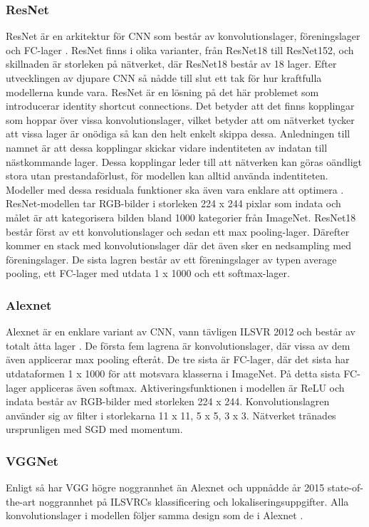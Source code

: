 \documentclass[]{kththesis}
\begin{document}
\subsubsection{ResNet}
ResNet är en arkitektur för CNN som består av konvolutionslager, föreningslager och FC-lager \parencite{he2016deep}. ResNet finns i olika varianter, från ResNet18 till ResNet152, och skillnaden är storleken på nätverket, där ResNet18 består av 18 lager. Efter utvecklingen av djupare CNN så nådde till slut ett tak för hur kraftfulla modellerna kunde vara. ResNet är en lösning på det här problemet som introducerar identity shortcut connections. Det betyder att det finns kopplingar som hoppar över vissa konvolutionslager, vilket betyder att om nätverket tycker att vissa lager är onödiga så kan den helt enkelt skippa dessa. Anledningen till namnet är att dessa kopplingar skickar vidare indentiteten av indatan till nästkommande lager. Dessa kopplingar leder till att nätverken kan göras oändligt stora utan prestandaförlust, för modellen kan alltid använda indentiteten. Modeller med dessa residuala funktioner ska även vara enklare att optimera \parencite{he2016deep}. ResNet-modellen tar RGB-bilder i storleken 224 x 244 pixlar som indata och målet är att kategorisera bilden bland 1000 kategorier från ImageNet. ResNet18 består först av ett konvolutionslager och sedan ett max pooling-lager. Därefter kommer en stack med konvolutionslager där det även sker en nedsampling med föreningslager. De sista lagren består av ett föreningslager av typen average pooling, ett FC-lager med utdata 1 x 1000 och ett softmax-lager.

\subsubsection{Alexnet}
Alexnet är en enklare variant av CNN, vann tävligen ILSVR 2012 och består av totalt åtta lager \parencite{krizhevsky2012imagenet}. De första fem lagrena är konvolutionslager, där vissa av dem även applicerar max pooling efteråt. De tre sista är FC-lager, där det sista har utdataformen 1 x 1000 för att motsvara klasserna i ImageNet. På detta sista FC-lager appliceras även softmax. Aktiveringsfunktionen i modellen är ReLU och indata består av RGB-bilder med storleken 224 x 244. Konvolutionslagren använder sig av filter i storlekarna 11 x 11, 5 x 5, 3 x 3. Nätverket tränades ursprunligen med SGD med momentum.

\subsubsection{VGGNet}
Enligt \cite{simonyan2014very} så har VGG högre noggrannhet än Alexnet och uppnådde år 2015 state-of-the-art noggrannhet på ILSVRCs klassificering och lokaliseringsuppgifter. Alla konvolutionslager i modellen följer samma design som de i Alexnet \parencite{simonyan2014very}. 
\end{document}
